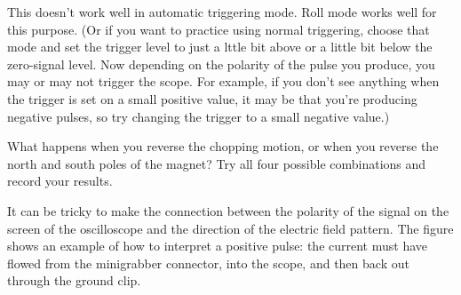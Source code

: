 This doesn't work well in automatic triggering mode. Roll mode works
well for this purpose. (Or if you want to practice using normal
triggering, choose that mode and set the trigger level to just a lttle
bit above or a little bit below the zero-signal level. Now depending
on the polarity of the pulse you produce, you may or may not trigger
the scope. For example, if you don't see anything when the trigger is
set on a small positive value, it may be that you're producing
negative pulses, so try changing the trigger to a small negative
value.)

What happens when you reverse the
chopping motion, or when you reverse the north and south
poles of the magnet? Try all four possible combinations and
record your results.


It can be tricky to make the connection between the polarity
of the signal on the screen of the oscilloscope and the
direction of the electric field pattern. The figure shows an
example of how to interpret a positive pulse: the current
must have flowed from the minigrabber connector, into the
scope, and then back out through the ground clip.




